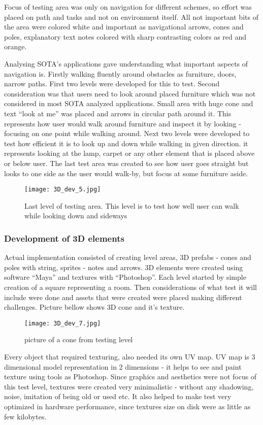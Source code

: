 Focus of testing area was only on navigation for different schemes, so effort was placed on path and tasks and not on environment itself. All not important bits of the area were colored white and important as navigational arrows, cones and poles, explanatory text notes colored with sharp contrasting colors as red and orange. 

Analysing SOTA’s applications gave understanding what important aspects of navigation is. Firstly walking fluently around obstacles as furniture, doors, narrow paths. First two levels were developed for this to test. Second consideration was that users need to look around placed furniture which was not considered in most SOTA analyzed applications. Small area with huge cone and text “look at me” was placed and arrows in circular path around it. This represents how user would walk around furniture and inspect it by looking - focusing on one point while walking around. Next two levels were developed to test how efficient it is to look up and down while walking in given direction. it represents looking at the lamp, carpet or any other element that is placed above or below user. The last test area was created to see how user goes straight but looks to one side as the user would walk-by, but focus at some furniture aside.
\begin{figure}[H]
\centering
\texttt{[image: 3D\_dev\_5.jpg]}
\caption{Last level of testing area. This level is to test how well user can walk while looking down and sideways}
\end{figure}

\subsubsection{Development of 3D elements}
Actual implementation consisted of creating level areas, 3D prefabs - cones and poles with string, sprites - notes and arrows. 3D elements were created using software “Maya” and textures with “Photoshop”. Each level started by simple creation of a square representing a room. Then considerations of what test it will include were done and assets that were created were placed making different challenges. Picture bellow shows 3D cone and it’s texture. 
\begin{figure}[H]
\centering
\texttt{[image: 3D\_dev\_7.jpg]}
\caption{picture of a cone from testing level}
\end{figure}

Every object that required texturing, also needed its own UV map. UV map is 3 dimensional model representation in 2 dimensions - it helps to see and paint texture using tools as Photoshop. Since graphics and aesthetics were not focus of this test level, textures were created very minimalistic - without any shadowing, noise, imitation of being old or used etc. It also helped to make test very optimized in hardware performance, since textures size on disk were as little as few kilobytes. 
